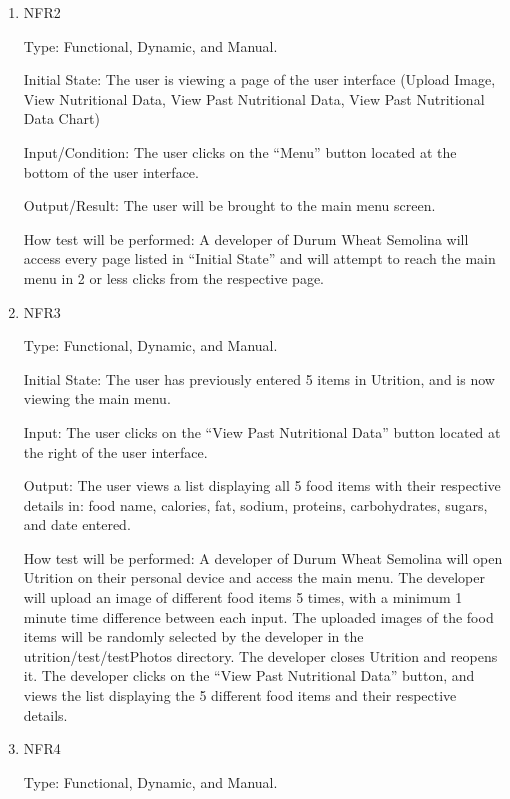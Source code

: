\documentclass[12pt, titlepage]{article}
\begin{document}
	\begin{enumerate}
		
		\item{NFR2\\}
		
		Type: Functional, Dynamic, and Manual.
		
		Initial State: The user is viewing a page of the user interface (Upload Image, View Nutritional Data, View Past Nutritional Data, View Past Nutritional Data Chart)
		
		Input/Condition: The user clicks on the “Menu” button located at the bottom of the user interface.
		
		Output/Result: The user will be brought to the main menu screen.
		
		How test will be performed: A developer of Durum Wheat Semolina will access every page listed in “Initial State” and will attempt to reach the main menu in 2 or less clicks from the respective page.
		
		
		\item{NFR3\\}
		
		Type: Functional, Dynamic, and Manual.
		
		Initial State: The user has previously entered 5 items in Utrition, and is now viewing the main menu.
		
		Input: The user clicks on the “View Past Nutritional Data” button located at the right of the user interface.
		
		Output: The user views a list displaying all 5 food items with their respective details in: food name, calories, fat, sodium, proteins, carbohydrates, sugars, and date entered.
		
		How test will be performed: A developer of Durum Wheat Semolina will open Utrition on their personal device and access the main menu. The developer will upload an image of different food items 5 times, with a minimum 1 minute time difference between each input. The uploaded images of the food items will be randomly selected by the developer in the utrition/test/testPhotos directory. The developer closes Utrition and reopens it. The developer clicks on the “View Past Nutritional Data” button, and views the list displaying the 5 different food items and their respective details.
		
		\item{NFR4\\}
		
		Type: Functional, Dynamic, and Manual.
		

\end{enumerate}
\end{document}
